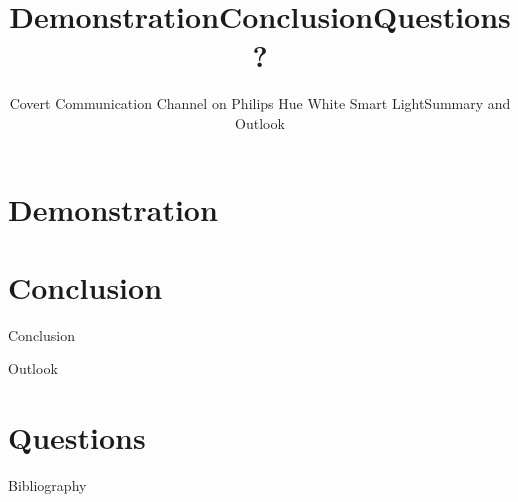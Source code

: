 \documentclass[11pt,t,usepdftitle=false,aspectratio=169]{beamer}
\begin{document}




\section{Demonstration} %
\label{sec:demonstration}
\title{Demonstration}
\subtitle{Covert Communication Channel on Philips Hue White Smart Light}

\section{Conclusion} %
\label{sec:conclusion}
\title{Conclusion}
\subtitle{Summary and Outlook}
\begin{frame}{Conclusion} %

\end{frame}

\begin{frame}{Outlook} %

\end{frame}



\title{Questions?}
\subtitle{}
\section{Questions}


\appendix

\begin{frame}[allowframebreaks]{Bibliography}
	
	
\end{frame}
\end{document}
